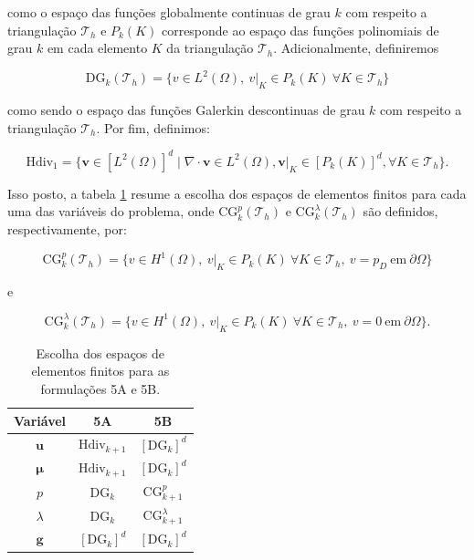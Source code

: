 como o espaço das funções globalmente continuas de grau $k$ com respeito a triangulação  $\mathcal{T}_{h}$ e $P_{k}(K)$ corresponde ao espaço das funções polinomiais de grau $k$ em cada elemento $K$ da triangulação $\mathcal{T}_{h}$. Adicionalmente, definiremos

\begin{equation}
	\text{DG}_k(\mathcal{T}_h) = \{  v \in L^2(\Omega),~ v|_K \in P_k(K)~\forall K \in \mathcal{T}_h \}
\end{equation}

como sendo o espaço das funções Galerkin descontinuas de grau $k$ com respeito a triangulação $\mathcal{T}_{h}$. Por fim, definimos:

\begin{equation}
	\text{Hdiv}_1 = \{ \mathbf{v} \in [L^2(\Omega)]^d \mid \nabla \cdot \mathbf{v} \in L^2(\Omega), \mathbf{v}|_K \in [P_k(K)]^d, \forall K \in \mathcal{T}_h \}.
\end{equation}

Isso posto, a tabela \ref{tab:espacos_elefim} resume a escolha dos espaços de elementos finitos para cada uma das variáveis do problema, onde $\text{CG}_k^{p}(\mathcal{T}_h)$ e $\text{CG}_k^{\lambda}(\mathcal{T}_h)$ são definidos, respectivamente, por:

\begin{equation}
	\text{CG}_k^{p}(\mathcal{T}_h) = \{ v \in H^1(\Omega),~ v|_K \in P_k(K)~\forall K \in \mathcal{T}_h,~v = p_D~\mbox{em}~\partial{\Omega} \}
\end{equation}

e 

\begin{equation}
	\text{CG}_k^{\lambda}(\mathcal{T}_h) = \{ v \in H^1(\Omega),~ v|_K \in P_k(K)~\forall K \in \mathcal{T}_h,~v = 0~\mbox{em}~\partial{\Omega}\}.  
\end{equation} 

\begin{table}[h!]
	\centering
	\caption{Escolha dos espaços de elementos finitos para as formulações 5A e 5B.}
	\label{tab:espacos_elefim}
	\begin{tabular}{ccc}
		\toprule
		\textbf{Variável} & \textbf{5A} & \textbf{5B} \\
		\midrule
		$\mathbf{u}$          & $\text{Hdiv}_{k+1}$ & $[\text{DG}_{k}]^{d}$ \\
		$\boldsymbol{\mu}$  & $\text{Hdiv}_{k+1}$ & $[\text{DG}_{k}]^{d}$ \\
		$p$    & $\text{DG}_{k}$      & $\text{CG}_{k+1}^{p}$     \\
		$\lambda$    & $\text{DG}_{k}$      & $\text{CG}_{k+1}^{\lambda}$     \\
		$\mathbf{g}$    & $[\text{DG}_{k}]^{d}$ & $[\text{DG}_{k}]^{d}$ \\
		\bottomrule
	\end{tabular}
\end{table}

